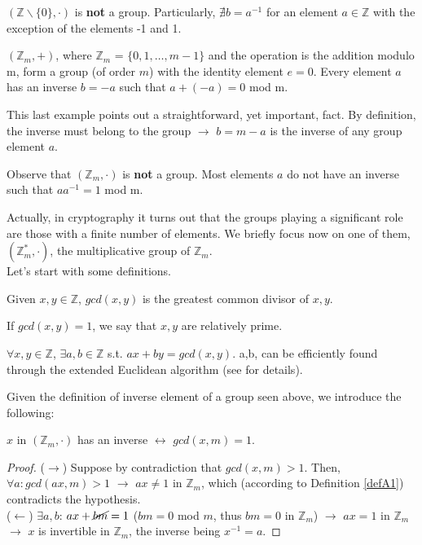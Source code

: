 \begin{myexample}
$(\mathbb{Z} \backslash \{0\},\cdot)$ is \textbf{not} a group. Particularly, $\nexists b = a^{-1}$ for an element $a \in \mathbb{Z}$ with the exception of the elements -1 and 1.
\end{myexample}
\begin{myexample}
$(\mathbb{Z}_m,+)$, where $\mathbb{Z}_m$ = $\{0,1,\dots,m-1\}$ and the operation is the addition modulo m, form a group (of order $m$) with the identity element $e = 0$. Every element $a$ has an inverse $b=-a$ such that $a + (-a) = 0$ mod m.
\end{myexample}
\begin{myrem}
This last example points out a straightforward, yet important, fact. By definition, the inverse must belong to the group $\rightarrow$ $b=m-a$ is the inverse of any group element $a$.
\end{myrem}
\begin{myrem}
Observe that $(\mathbb{Z}_m,\cdot)$ is \textbf{not} a group. Most elements $a$ do not have an inverse such that $aa^{-1} = 1$ mod m.
\end{myrem}
\noindent
Actually, in cryptography it turns out that the groups playing a significant role are those with a finite number of elements. We briefly focus now on one of them, $(\mathbb{Z}_m^{*},\cdot)$, the multiplicative group of $\mathbb{Z}_m$.\\
Let's start with some definitions.
\begin{mydef}
    Given $x,y \in \mathbb{Z}$, $gcd(x,y)$ is the greatest common divisor of $x,y$.
\end{mydef}
\label{defA2}
\begin{myrem}
    If $gcd(x,y)=1$, we say that $x,y$ are relatively prime.
\end{myrem}
\begin{mylemma}
    $\forall x,y \in \mathbb{Z}$, $\exists a,b \in \mathbb{Z}$ s.t. $ax+by=gcd(x,y)$. a,b, can be efficiently found through the extended Euclidean algorithm (see \cite{UnderstandingCrypto} for details).
\end{mylemma}
\noindent
Given the definition of inverse element of a group seen above, we introduce the following:
\begin{mylemma}
    $x$ in $(\mathbb{Z}_m,\cdot)$ has an inverse $\longleftrightarrow$ $gcd(x,m)=1$. 
\end{mylemma}
\begin{proof} ($\longrightarrow$) Suppose by contradiction that $gcd(x,m)>1$. Then, $\forall a: gcd(ax,m)>1$ $\rightarrow$ $ax \neq 1$ in $\mathbb{Z}_m$, which (according to Definition \ref{defA1}) contradicts the hypothesis.\\
($\longleftarrow$) $\exists a,b$: $ax + \cancel{bm} = 1$ ($bm = 0$ mod $m$, thus $bm=0$ in $\mathbb{Z}_m$) $\rightarrow$ $ax=1$ in $\mathbb{Z}_m$ $\rightarrow$ $x$ is invertible in $\mathbb{Z}_m$, the inverse being $x^{-1}=a$.
\end{proof}
